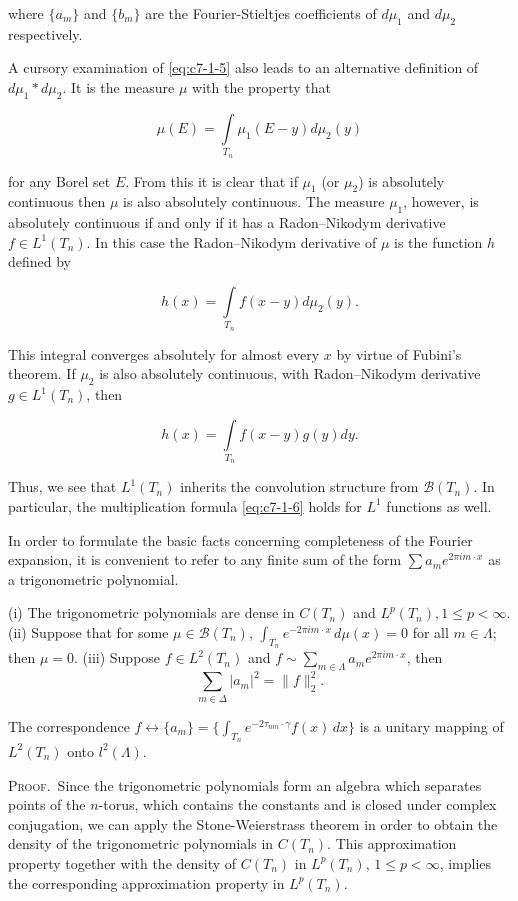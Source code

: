 where $\{a_m\}$ and $\{b_m\}$ are the Fourier-Stieltjes coefficients of $d\mu_1$ and $d\mu_2$ respectively.

A cursory examination of \eqref{eq:c7-1-5} also leads to an alternative definition of $d\mu_1*d\mu_2$. It is the measure $\mu$ with the property that

\[
\mu(E)=\int\limits_{T_{n}}\mu_{1}(E-y)d\mu_{2}(y)
\]

for any Borel set $E$. From this it is clear that if $\mu_1$ (or $\mu_2$) is absolutely continuous then $\mu$ is also absolutely continuous. The measure $\mu_1$, however, is absolutely continuous if and only if it has a Radon--Nikodym derivative $f\in L^1(T_n)$. In this case the Radon--Nikodym derivative of $\mu$ is the function $h$ defined by

\[
h(x)=\int\limits_{T_{n}}f(x-y)d\mu_{2}(y).
\]

This integral converges absolutely for almost every $x$ by virtue of Fubini's theorem. If $\mu_2$ is also absolutely continuous, with Radon--Nikodym derivative $g \in L^1(T_n)$, then

\[
h(x)=\int\limits_{T_{n}}f(x-y)g(y)d y.
\]

Thus, we see that $L^{1}(T_{n})$ inherits the convolution structure from $\mathcal{B}(T_{n})$. In particular, the multiplication formula \eqref{eq:c7-1-6} holds for $L^{1}$ functions as well.

In order to formulate the basic facts concerning completeness of the Fourier expansion, it is convenient to refer to any finite sum of the form $\sum a_m e^{2\pi im \cdot x}$ as a trigonometric polynomial.

\begin{theorem}
\label{thm:c7-1-7}
(i) The trigonometric polynomials are dense in $C(T_n)$ and $L^p(T_n), 1 \leq p < \infty$.
(ii) Suppose that for some $\mu \in \mathcal{B}(T_n)$, $\int_{T_n} e^{-2\pi i m \cdot x} \, d\mu(x) = 0$ for all $m \in \Lambda$; then $\mu = 0$.
(iii) Suppose $f \in L^2(T_n)$ and $f \sim \sum_{m \in \Lambda} a_m e^{2\pi i m \cdot x}$, then
\[
\sum_{m\in\Delta}|a_{m}|^{2}=\|f\|_{2}^{2}.
\]

\end{theorem}

The correspondence $f \leftrightarrow \{a_m\} = \{\int_{T_n} e^{-2\tau_{nm} \cdot \gamma} f(x) \, dx\}$ is a unitary mapping of $L^2(T_n)$ onto $l^2(\Lambda)$.

\textsc{Proof.}\ Since the trigonometric polynomials form an algebra which separates points of the $n$-torus, which contains the constants and is closed under complex conjugation, we can apply the Stone-Weierstrass theorem in order to obtain the density of the trigonometric polynomials in $C(T_n)$. This approximation property together with the density of $C(T_n)$ in $L^p(T_n)$, $1 \leq p < \infty$, implies the corresponding approximation property in $L^p(T_n)$.

